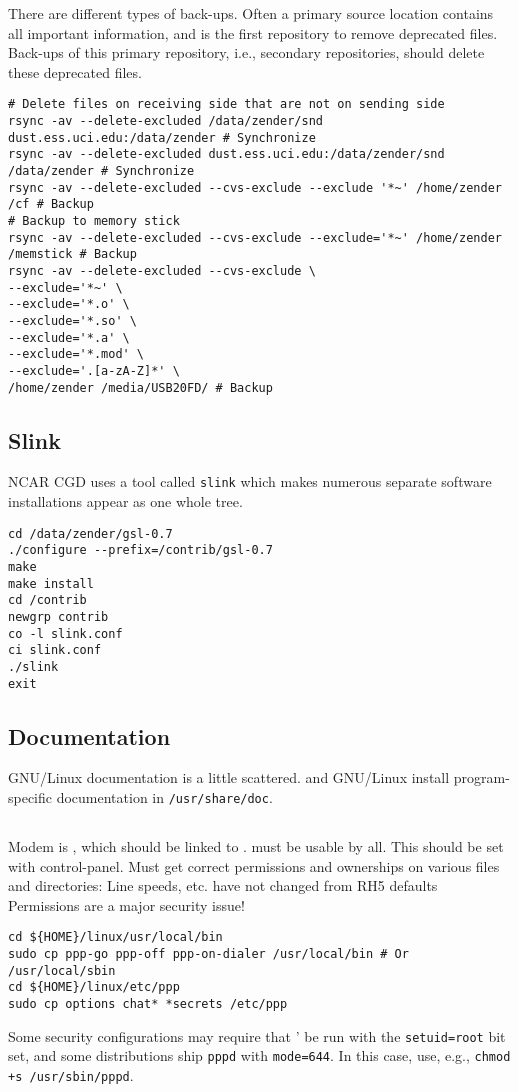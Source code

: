 \documentclass[12pt,twoside]{article}
\begin{document}
There are different types of back-ups. 
Often a primary source location contains all important information,
and is the first repository to remove deprecated files.
Back-ups of this primary repository, i.e., secondary repositories,
should delete these deprecated files.
\begin{verbatim}
# Delete files on receiving side that are not on sending side
rsync -av --delete-excluded /data/zender/snd dust.ess.uci.edu:/data/zender # Synchronize
rsync -av --delete-excluded dust.ess.uci.edu:/data/zender/snd /data/zender # Synchronize
rsync -av --delete-excluded --cvs-exclude --exclude '*~' /home/zender /cf # Backup 
# Backup to memory stick
rsync -av --delete-excluded --cvs-exclude --exclude='*~' /home/zender /memstick # Backup 
rsync -av --delete-excluded --cvs-exclude \
--exclude='*~' \
--exclude='*.o' \
--exclude='*.so' \
--exclude='*.a' \
--exclude='*.mod' \
--exclude='.[a-zA-Z]*' \
/home/zender /media/USB20FD/ # Backup 
\end{verbatim}

\subsection{Slink}
NCAR CGD uses a tool called \verb'slink' which makes numerous
separate software installations appear as one whole tree.
\begin{verbatim}
cd /data/zender/gsl-0.7
./configure --prefix=/contrib/gsl-0.7
make
make install
cd /contrib
newgrp contrib
co -l slink.conf
ci slink.conf
./slink
exit
\end{verbatim}

\subsection{Documentation}\label{sxn:doc}
GNU/Linux documentation is a little scattered.
 and  GNU/Linux install program-specific
documentation in \verb'/usr/share/doc'.

\subsection{}\label{sxn:ppp}
Modem is , which should be linked to . 
\flprn{/dev/modem} must be usable by all.
This should be set with control-panel.
Must get correct permissions and ownerships on various files and directories:
Line speeds, etc. have not changed from RH5 defaults
Permissions are a major security issue!
\begin{verbatim}
cd ${HOME}/linux/usr/local/bin
sudo cp ppp-go ppp-off ppp-on-dialer /usr/local/bin # Or /usr/local/sbin
cd ${HOME}/linux/etc/ppp
sudo cp options chat* *secrets /etc/ppp
\end{verbatim}
Some security configurations may require that ' be run with
the \verb'setuid=root' bit set, and some distributions ship
\verb'pppd' with \verb'mode=644'.
In this case, use, e.g., \verb'chmod +s /usr/sbin/pppd'.
\end{document}
